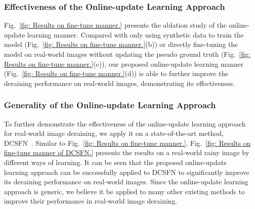 \documentclass[letterpaper]{article} %
\begin{document}
\subsubsection{Effectiveness of the Online-update Learning Approach}
%
Fig.~\ref{fig: Results on fine-tune manner.} presents the ablation study of the online-update learning manner. Compared with only using synthetic data to train the model (Fig.~\ref{fig: Results on fine-tune manner.}(b)) or directly fine-tuning the model on real-world images without updating the pseudo ground truth (Fig.~\ref{fig: Results on fine-tune manner.}(c)), our proposed online-update learning manner (Fig.~\ref{fig: Results on fine-tune manner.}(d)) is able to further improve the deraining performance on real-world images, demonstrating its effectiveness.
%
\subsubsection{Generality of the Online-update Learning Approach}
%
To further demonstrate the effectiveness of the online-update learning approach for real-world image deraining, we apply it on a state-of-the-art method, DCSFN~\cite{mm20_wang_dcsfn}.
Similar to Fig.~\ref{fig: Results on fine-tune manner.}, Fig.~\ref{fig: Results on fine-tune manner of DCSFN.} presents the results on a real-world rainy image by different ways of learning.
It can be seen that the proposed online-update learning approach can be successfully applied to DCSFN to significantly improve its deraining performance on real-world images. Since the online-update learning approach is generic, we believe it be applied to many other existing methods to improve their performance in real-world image deraining.
\end{document}
